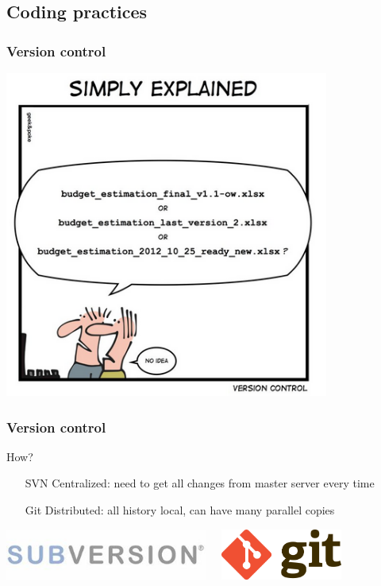 \documentclass[14pt]{beamer}
\begin{document}
\subsection{Coding practices}
\begin{frame}
\frametitle{Version control}
\centering
\includegraphics[width=0.8\textwidth]{Version-Control-Comic}

\end{frame}

\begin{frame}
\frametitle{Version control}
\begin{block}{How?}
\begin{itemize}
\item[SVN] Centralized: need to get all changes from master server every time
\item[\alert{Git}] Distributed: all history local, can have many parallel copies
\end{itemize}
\includegraphics[width=0.5\textwidth]{svn-name-banner.jpg}$\quad$
\includegraphics[width=0.3\textwidth]{Git-Logo-2Color.png}
\end{block}
\end{frame}
\end{document}
